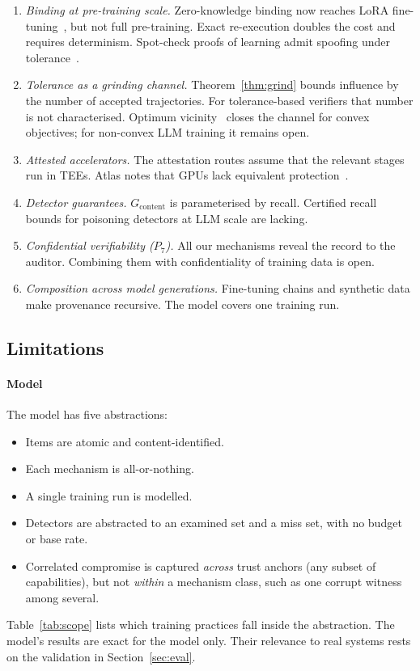 \begin{enumerate}
\item \emph{Binding at pre-training scale.} Zero-knowledge binding now reaches LoRA
  fine-tuning~\cite{liao2026verilora}, but not full pre-training. Exact re-execution
  doubles the cost and requires determinism. Spot-check proofs of learning admit spoofing
  under tolerance~\cite{fang2023pol}.
\item \emph{Tolerance as a grinding channel.} Theorem~\ref{thm:grind} bounds influence by the
  number of accepted trajectories. For tolerance-based verifiers that number is not
  characterised. Optimum vicinity~\cite{tan2025zkpot} closes the channel for convex
  objectives; for non-convex LLM training it remains open.
\item \emph{Attested accelerators.} The attestation routes assume that the relevant stages run
  in TEEs. Atlas notes that GPUs lack equivalent protection~\cite{spoczynski2025atlas}.
\item \emph{Detector guarantees.} $G_{\mathrm{content}}$ is parameterised by recall. Certified
  recall bounds for poisoning detectors at LLM scale are lacking.
\item \emph{Confidential verifiability ($P_7$).} All our mechanisms reveal the record to the
  auditor. Combining them with confidentiality of training data is open.
\item \emph{Composition across model generations.} Fine-tuning chains and synthetic data make
  provenance recursive. The model covers one training run.
\end{enumerate}

\subsection{Limitations}

\paragraph{Model}
The model has five abstractions:
\begin{itemize}
\item Items are atomic and content-identified.
\item Each mechanism is all-or-nothing.
\item A single training run is modelled.
\item Detectors are abstracted to an examined set and a miss set, with no budget or base
  rate.
\item Correlated compromise is captured \emph{across} trust anchors (any subset of
  capabilities), but not \emph{within} a mechanism class, such as one corrupt witness among
  several.
\end{itemize}
Table~\ref{tab:scope} lists which training practices fall inside the abstraction. The
model's results are exact for the model only. Their relevance to real systems rests on the
validation in Section~\ref{sec:eval}.

